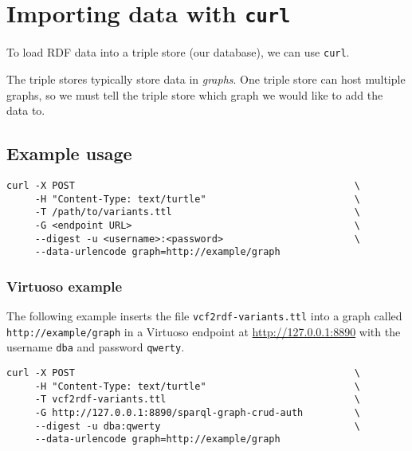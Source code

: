 \section{Importing data with \texttt{curl}}
\label{sec:curl}

  To load RDF data into a triple store (our database), we can use \texttt{curl}.

  The triple stores typically store data in \emph{graphs}.  One triple store
  can host multiple graphs, so we must tell the triple store which graph we
  would like to add the data to.

\subsection{Example usage}

\begin{siderules}
\begin{verbatim}
curl -X POST                                                 \
     -H "Content-Type: text/turtle"                          \
     -T /path/to/variants.ttl                                \
     -G <endpoint URL>                                       \
     --digest -u <username>:<password>                       \
     --data-urlencode graph=http://example/graph
\end{verbatim}
\end{siderules}

\subsubsection{Virtuoso example}

\begin{sloppypar}
The following example inserts the file \texttt{vcf2rdf-variants.ttl} into
a graph called \texttt{http://example/graph} in a Virtuoso endpoint at
\url{http://127.0.0.1:8890} with the username \texttt{dba} and
password \texttt{qwerty}.
\end{sloppypar}

\begin{siderules}
\begin{verbatim}
curl -X POST                                                 \
     -H "Content-Type: text/turtle"                          \
     -T vcf2rdf-variants.ttl                                 \
     -G http://127.0.0.1:8890/sparql-graph-crud-auth         \
     --digest -u dba:qwerty                                  \
     --data-urlencode graph=http://example/graph
\end{verbatim}
\end{siderules}

